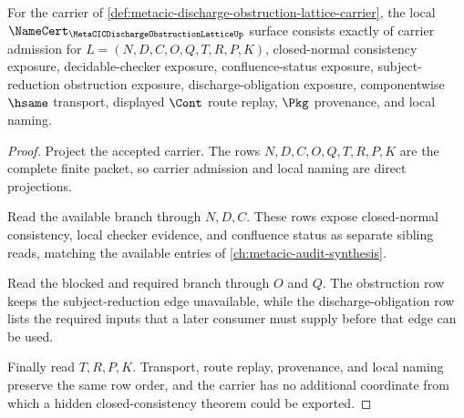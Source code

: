 \begin{theorem}
\label{thm:metacic-discharge-obstruction-lattice-namecert-obligations}
For the carrier of \autoref{def:metacic-discharge-obstruction-lattice-carrier}, the local $\NameCert_{\MetaCICDischargeObstructionLatticeUp}$ surface consists exactly of carrier admission for $L=(N,D,C,O,Q,T,R,P,K)$, closed-normal consistency exposure, decidable-checker exposure, confluence-status exposure, subject-reduction obstruction exposure, discharge-obligation exposure, componentwise $\hsame$ transport, displayed $\Cont$ route replay, $\Pkg$ provenance, and local naming.
\end{theorem}
\begin{proof}
Project the accepted carrier. The rows $N,D,C,O,Q,T,R,P,K$ are the complete finite packet, so carrier admission and local naming are direct projections.

Read the available branch through $N,D,C$. These rows expose closed-normal consistency, local checker evidence, and confluence status as separate sibling reads, matching the available entries of \autoref{ch:metacic-audit-synthesis}.

Read the blocked and required branch through $O$ and $Q$. The obstruction row keeps the subject-reduction edge unavailable, while the discharge-obligation row lists the required inputs that a later consumer must supply before that edge can be used.

Finally read $T,R,P,K$. Transport, route replay, provenance, and local naming preserve the same row order, and the carrier has no additional coordinate from which a hidden closed-consistency theorem could be exported.
\end{proof}

